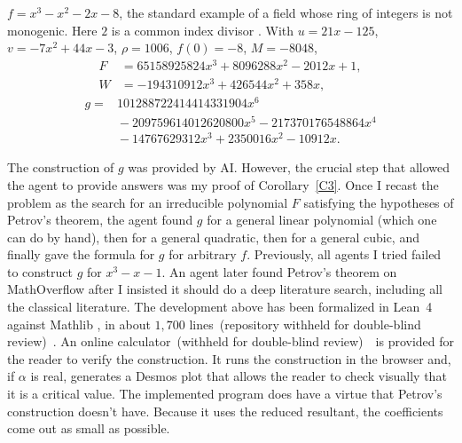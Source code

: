 \begin{example}\label{Ex85}
  $f = x^{3} - x^{2} - 2x - 8$, the standard example of a field whose ring of
  integers is not monogenic. Here $2$ is a common index divisor
  \cite{dedekind1878}. With $u = 21x - 125$, $v = -7x^{2} + 44x - 3$,
  $\rho = 1006$, $f(0) = -8$, $M = -8048$,
  \begin{align*}
    F &= 65158925824x^{3} + 8096288x^{2} - 2012x + 1, \\
    W &= -194310912x^{3} + 426544x^{2} + 358x,
  \end{align*}
  \[
    \begin{aligned}
      g = {}& 101288722414414331904x^{6} \\
            & {} - 209759614012620800x^{5} - 217370176548864x^{4} \\
            & {} - 14767629312x^{3} + 2350016x^{2} - 10912x .
    \end{aligned}
  \]
\end{example}

\label{Sformal}

The construction of $g$ was provided by AI. However, the crucial step that
allowed the agent to provide answers was my proof of Corollary~\ref{C3}. Once I
recast the problem as the search for an irreducible polynomial $F$ satisfying
the hypotheses of Petrov's theorem, the agent found $g$ for a general linear
polynomial (which one can do by hand), then for a general quadratic, then for a
general cubic, and finally gave the formula for $g$ for arbitrary $f$.
Previously, all agents I tried failed to construct $g$ for $x^{3}-x-1$.
An agent later found Petrov's theorem on MathOverflow after I insisted it
should do a deep literature search, including all the classical literature.
The development above has been formalized in Lean~4 \cite{lean4} against
Mathlib \cite{mathlib}, in about $1{,}700$ lines\ifanonymous\ (repository
withheld for double-blind review)\else\ \cite{repo}\fi. An online
calculator\ifanonymous\ (withheld for double-blind review)\else\ \cite{app}\fi\ is
provided for the reader to verify the construction. It
runs the construction in the browser and, if $\alpha$ is real, generates a
Desmos plot that allows the reader to check visually that it is a critical
value. The implemented program does have a virtue that Petrov's construction
doesn't have. Because it uses the reduced resultant, the coefficients come out
as small as possible.
